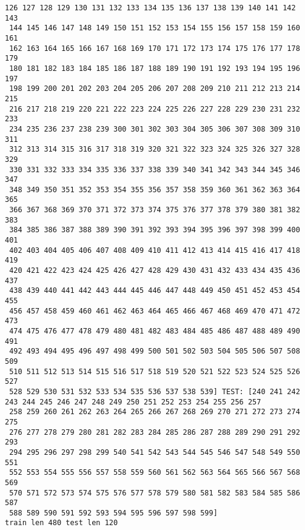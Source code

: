 \documentclass[11pt]{article}
\begin{document}
\begin{Verbatim}[commandchars=\\\{\}]
 126 127 128 129 130 131 132 133 134 135 136 137 138 139 140 141 142 143
 144 145 146 147 148 149 150 151 152 153 154 155 156 157 158 159 160 161
 162 163 164 165 166 167 168 169 170 171 172 173 174 175 176 177 178 179
 180 181 182 183 184 185 186 187 188 189 190 191 192 193 194 195 196 197
 198 199 200 201 202 203 204 205 206 207 208 209 210 211 212 213 214 215
 216 217 218 219 220 221 222 223 224 225 226 227 228 229 230 231 232 233
 234 235 236 237 238 239 300 301 302 303 304 305 306 307 308 309 310 311
 312 313 314 315 316 317 318 319 320 321 322 323 324 325 326 327 328 329
 330 331 332 333 334 335 336 337 338 339 340 341 342 343 344 345 346 347
 348 349 350 351 352 353 354 355 356 357 358 359 360 361 362 363 364 365
 366 367 368 369 370 371 372 373 374 375 376 377 378 379 380 381 382 383
 384 385 386 387 388 389 390 391 392 393 394 395 396 397 398 399 400 401
 402 403 404 405 406 407 408 409 410 411 412 413 414 415 416 417 418 419
 420 421 422 423 424 425 426 427 428 429 430 431 432 433 434 435 436 437
 438 439 440 441 442 443 444 445 446 447 448 449 450 451 452 453 454 455
 456 457 458 459 460 461 462 463 464 465 466 467 468 469 470 471 472 473
 474 475 476 477 478 479 480 481 482 483 484 485 486 487 488 489 490 491
 492 493 494 495 496 497 498 499 500 501 502 503 504 505 506 507 508 509
 510 511 512 513 514 515 516 517 518 519 520 521 522 523 524 525 526 527
 528 529 530 531 532 533 534 535 536 537 538 539] TEST: [240 241 242 243 244 245 246 247 248 249 250 251 252 253 254 255 256 257
 258 259 260 261 262 263 264 265 266 267 268 269 270 271 272 273 274 275
 276 277 278 279 280 281 282 283 284 285 286 287 288 289 290 291 292 293
 294 295 296 297 298 299 540 541 542 543 544 545 546 547 548 549 550 551
 552 553 554 555 556 557 558 559 560 561 562 563 564 565 566 567 568 569
 570 571 572 573 574 575 576 577 578 579 580 581 582 583 584 585 586 587
 588 589 590 591 592 593 594 595 596 597 598 599]
train len 480 test len 120

    \end{Verbatim}
\end{document}
